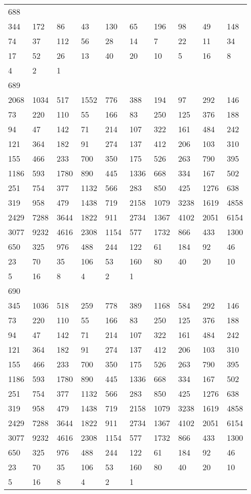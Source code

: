 \begin{longtable}{*{10}{l}}
688&&&&&&&&&\\
344& 172& 86& 43& 130& 65& 196& 98& 49& 148\\
74& 37& 112& 56& 28& 14& 7& 22& 11& 34\\
17& 52& 26& 13& 40& 20& 10& 5& 16& 8\\
4& 2& 1& \\

689&&&&&&&&&\\
2068& 1034& 517& 1552& 776& 388& 194& 97& 292& 146\\
73& 220& 110& 55& 166& 83& 250& 125& 376& 188\\
94& 47& 142& 71& 214& 107& 322& 161& 484& 242\\
121& 364& 182& 91& 274& 137& 412& 206& 103& 310\\
155& 466& 233& 700& 350& 175& 526& 263& 790& 395\\
1186& 593& 1780& 890& 445& 1336& 668& 334& 167& 502\\
251& 754& 377& 1132& 566& 283& 850& 425& 1276& 638\\
319& 958& 479& 1438& 719& 2158& 1079& 3238& 1619& 4858\\
2429& 7288& 3644& 1822& 911& 2734& 1367& 4102& 2051& 6154\\
3077& 9232& 4616& 2308& 1154& 577& 1732& 866& 433& 1300\\
650& 325& 976& 488& 244& 122& 61& 184& 92& 46\\
23& 70& 35& 106& 53& 160& 80& 40& 20& 10\\
5& 16& 8& 4& 2& 1& \\

690&&&&&&&&&\\
345& 1036& 518& 259& 778& 389& 1168& 584& 292& 146\\
73& 220& 110& 55& 166& 83& 250& 125& 376& 188\\
94& 47& 142& 71& 214& 107& 322& 161& 484& 242\\
121& 364& 182& 91& 274& 137& 412& 206& 103& 310\\
155& 466& 233& 700& 350& 175& 526& 263& 790& 395\\
1186& 593& 1780& 890& 445& 1336& 668& 334& 167& 502\\
251& 754& 377& 1132& 566& 283& 850& 425& 1276& 638\\
319& 958& 479& 1438& 719& 2158& 1079& 3238& 1619& 4858\\
2429& 7288& 3644& 1822& 911& 2734& 1367& 4102& 2051& 6154\\
3077& 9232& 4616& 2308& 1154& 577& 1732& 866& 433& 1300\\
650& 325& 976& 488& 244& 122& 61& 184& 92& 46\\
23& 70& 35& 106& 53& 160& 80& 40& 20& 10\\
5& 16& 8& 4& 2& 1& \\


\end{longtable}
